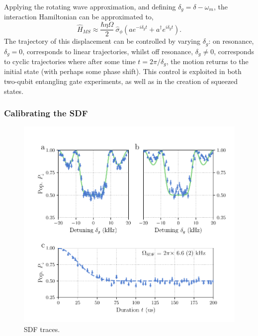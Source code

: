     Applying the rotating wave approximation, and defining $\delta_g = \delta -
    \omega_{m}$, the interaction Hamiltonian can be approximated
    to,
    \begin{equation}
        \hat{H}_{MS} \approx \frac{\hbar \eta\Omega}{2}~\hat{\sigma}_\phi \left( a e^{-i\delta_g t} + a^\dagger e^{i\delta_g t} \right).
    \end{equation}
    The trajectory of this displacement can be controlled by varying $\delta_g$: on
    resonance, $\delta_g = 0$, corresponds to linear trajectories, whilst off resonance,
    $\delta_g \neq 0$, corresponds to cyclic trajectories where after some time $t =
    2\pi/\delta_g$, the motion returns to the initial state (with perhaps some phase shift). 
    This control is exploited in both two-qubit entangling gate experiments, as well as
    in the creation of squeezed states.\\

\subsubsection{Calibrating the SDF}

    \begin{figure}
        \begin{center}
        \noindent\includegraphics[width=\linewidth]{
            figures/pdf_figure/sdf.pdf
            }
        \end{center}
        \caption{
            SDF traces. 
            }
        \label{fig:SDF}
    \end{figure}

